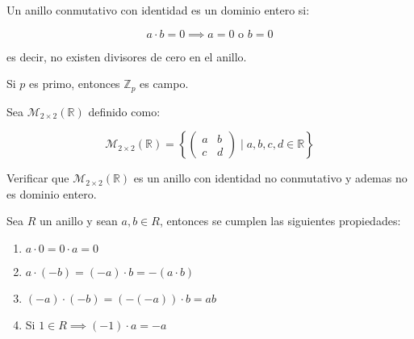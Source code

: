         \begin{definicion}
            Un anillo conmutativo con identidad es un dominio entero si:

            \begin{equation}
                a \cdot b = 0 \implies a = 0 \text{ o } b = 0
            \end{equation}

            es decir, no existen divisores de cero en el anillo.
        \end{definicion}

        \begin{observacion}
            Si $p$ es primo, entonces $\mathbb{Z}_p$ es campo.
        \end{observacion}

        \begin{ejercicio}
            Sea $\mathcal{M}_{2 \times 2}(\mathbb{R})$ definido como:

            \begin{equation}
                \mathcal{M}_{2 \times 2}(\mathbb{R}) = \left\{ \begin{pmatrix} a & b \\ c & d \end{pmatrix} \mid a, b, c, d \in \mathbb{R} \right\}
            \end{equation}

            Verificar que $\mathcal{M}_{2 \times 2}(\mathbb{R})$ es un anillo con identidad no conmutativo y ademas no es dominio entero.
        \end{ejercicio}

        \begin{proposicion}
            Sea $R$ un anillo y sean $a, b \in R$, entonces se cumplen las siguientes propiedades:

            \begin{enumerate}
                \item $a \cdot 0 = 0 \cdot a = 0$
                \item $a \cdot (-b) = (-a) \cdot b = -(a \cdot b)$
                \item $(-a) \cdot (-b) = (-(-a)) \cdot b = ab$
                \item Si $1 \in R \implies (-1) \cdot a = -a$
            \end{enumerate}
        \end{proposicion}

